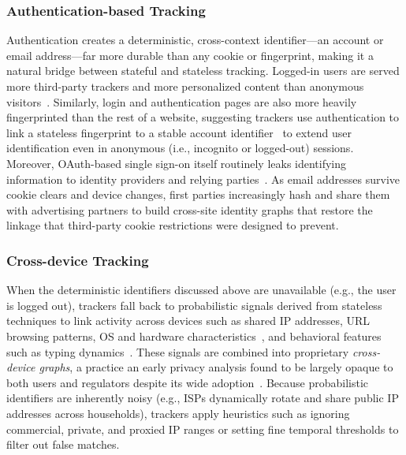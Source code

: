 \subsubsection{Authentication-based Tracking}
\label{sec:mixed-techniques-auth-tracking}

Authentication creates a deterministic, cross-context identifier---an account or email address---far more durable than any cookie or fingerprint, making it a natural bridge between stateful and stateless tracking.
%
Logged-in users are served more third-party trackers and more personalized content than anonymous visitors~\cite{kaizerCharacterizingWebsiteBehaviors2016}.
%
Similarly, login and authentication pages are also more heavily fingerprinted than the rest of a website, suggesting trackers use authentication to link a stateless fingerprint to a stable account identifier~\cite{senolDoubleEdgedSword2024} to extend user identification even in anonymous (i.e., incognito or logged-out) sessions.
%
Moreover, OAuth-based single sign-on itself routinely leaks identifying information to identity providers and relying parties~\cite{dimovaEverybodysLookingSSOmething2023}.
%
As email addresses survive cookie clears and device changes, first parties increasingly hash and share them with advertising partners to build cross-site identity graphs that restore the linkage that third-party cookie restrictions were designed to prevent.


\subsubsection{Cross-device Tracking}
\label{sec:mixed-techniques-cross-device}

When the deterministic identifiers discussed above are unavailable (e.g., the user is logged out), trackers fall back to probabilistic signals derived from stateless techniques to link activity across devices such as shared IP addresses, URL browsing patterns, OS and hardware characteristics~\cite{caoCrossBrowserFingerprintingOS2017}, and behavioral features such as typing dynamics~\cite{yuanCrossdeviceTrackingIdentification2018}.
%
These signals are combined into proprietary \textit{cross-device graphs}, a practice an early privacy analysis found to be largely opaque to both users and regulators despite its wide adoption~\cite{zimmeckPrivacyAnalysisCrossdevice2017,brookmanCrossDeviceTrackingMeasurement2017}.
%
Because probabilistic identifiers are inherently noisy (e.g., ISPs dynamically rotate and share public IP addresses across households), trackers apply heuristics such as ignoring commercial, private, and proxied IP ranges or setting fine temporal thresholds to filter out false matches.


